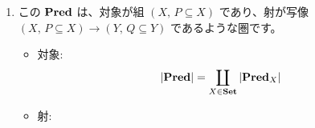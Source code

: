 \documentclass[
		head_space=20mm,
		foot_space=20mm,
		gutter=10mm,
		line_length=190mm
]{jlreq}
\begin{document}
\begin{enumerate}
\begin{small}
\begin{center}
		\end{center}
	\end{small} \clearpage
	\item この $\mathbf{Pred}$ は、対象が組 $(X,\,P\subseteq X)$ であり、射が写像 $(X,\,P\subseteq X)\to(Y,\,Q\subseteq Y)$ であるような圏です。
	\begin{itemize}
		\item 対象: \[\left|\mathbf{Pred}\right|=\coprod_{X\in\mathbf{Set}}\left|\mathbf{Pred}_X\right|\]
		\item 射: 
				\begin{prooftree}

\end{prooftree}
\end{itemize}
\end{enumerate}
\end{document}
